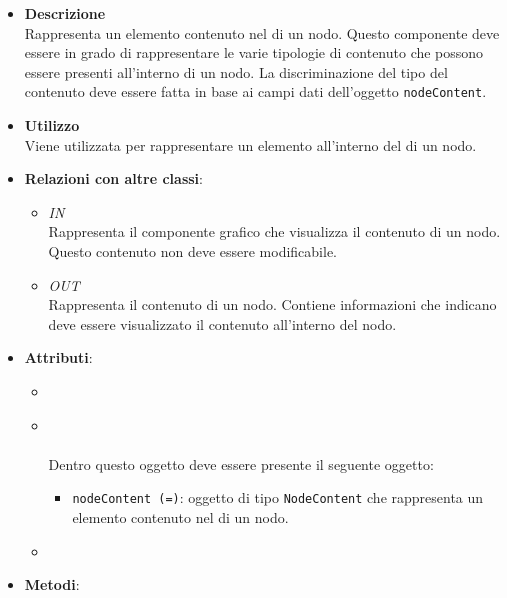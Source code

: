 \FloatBarrier
\begin{itemize}
\item \textbf{Descrizione}\\
Rappresenta un elemento contenuto nel  di un nodo.
Questo componente deve essere in grado di rappresentare le varie tipologie di contenuto che possono essere presenti all’interno di un nodo.  La discriminazione del tipo del contenuto deve essere fatta in base ai campi dati dell’oggetto \texttt{nodeContent}.
\item \textbf{Utilizzo}\\
Viene utilizzata per rappresentare un elemento all'interno del  di un nodo.
\item \textbf{Relazioni con altre classi}:
\begin{itemize}
\item \textit{IN} \hyperref[\nogloxy{Premi::Front-End::Directives::premiNode}]{}\\
Rappresenta il componente grafico che visualizza il contenuto di un nodo. Questo contenuto non deve essere modificabile.
\item \textit{OUT} \hyperref[\nogloxy{Premi::Front-End::Model::NodeContent}]{}\\
Rappresenta il contenuto di un nodo. Contiene informazioni che indicano deve essere visualizzato il contenuto all’interno del nodo.
\end{itemize}
\item \textbf{Attributi}:
\begin{itemize}
\item {}
\\ \dpRestrict
\item {}
\\ \dpIsolatedScope \\
Dentro questo oggetto deve essere presente il seguente oggetto:
\begin{itemize}
\item \texttt{nodeContent (=)}: oggetto di tipo \texttt{NodeContent} che rappresenta un elemento contenuto nel  di un nodo.
\end{itemize}
\item {}
\\ \dpTemplate
\end{itemize}
\item \textbf{Metodi}:
\begin{itemize}

\end{itemize}
\end{itemize}
